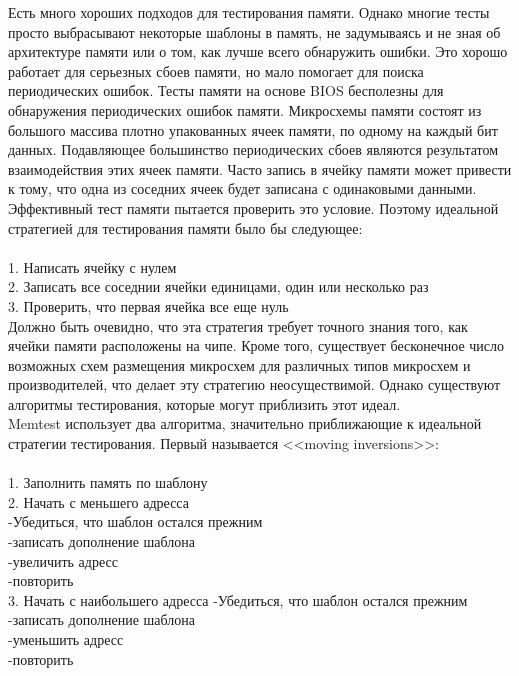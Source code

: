 \documentclass[a4paper,14pt]{extarticle}
\begin{document}
Есть много хороших подходов для тестирования памяти. Однако многие тесты просто выбрасывают некоторые шаблоны в память, не задумываясь и не зная об архитектуре памяти или о том, как лучше всего обнаружить ошибки. Это хорошо работает для серьезных сбоев памяти, но мало помогает для поиска периодических ошибок. Тесты памяти на основе BIOS бесполезны для обнаружения периодических ошибок памяти. Микросхемы памяти состоят из большого массива плотно упакованных ячеек памяти, по одному на каждый бит данных. Подавляющее большинство периодических сбоев являются результатом взаимодействия этих ячеек памяти. Часто запись в ячейку памяти может привести к тому, что одна из соседних ячеек будет записана с одинаковыми данными. Эффективный тест памяти пытается проверить это условие. Поэтому идеальной стратегией для тестирования памяти было бы следующее:\\ \\
1. Написать ячейку с нулем\\
2. Записать все соседнии ячейки единицами, один или несколько раз\\
3. Проверить, что первая ячейка все еще нуль\\

Должно быть очевидно, что эта стратегия требует точного знания того, как ячейки памяти расположены на чипе. Кроме того, существует бесконечное число возможных схем размещения микросхем для различных типов микросхем и производителей, что делает эту стратегию неосуществимой. Однако существуют алгоритмы тестирования, которые могут приблизить этот идеал.\\

Memtest использует два алгоритма, значительно приближающие к идеальной стратегии тестирования. Первый называется <<moving inversions>>:\\ \\
1. Заполнить память по шаблону\\
2. Начать с меньшего адресса\\
 -Убедиться, что шаблон остался прежним\\
 -записать дополнение шаблона\\
 -увеличить адресс\\
 -повторить\\
3. Начать с наибольшего адресса
 -Убедиться, что шаблон остался прежним\\
 -записать дополнение шаблона\\
 -уменьшить адресс\\
 -повторить\\
\end{document}
